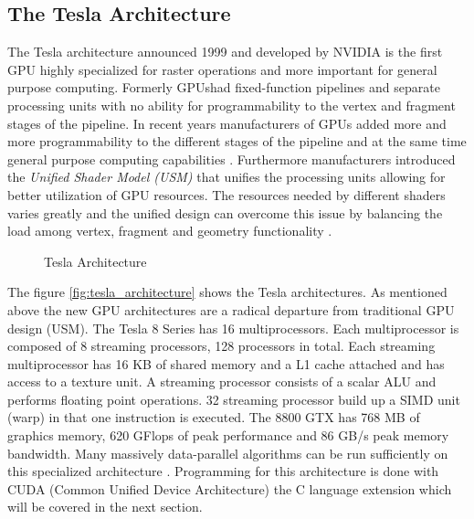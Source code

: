 \subsection*{The Tesla Architecture} %
\label{sub:the_tesla_architecture}
The Tesla architecture announced 1999 and developed by NVIDIA is the first
GPU highly specialized for raster operations and more important
for general purpose computing. Formerly \glspl{GPU}had fixed-function
pipelines and separate processing units with no ability for programmability to
the vertex and fragment stages of the pipeline. In recent years manufacturers of
GPUs added more and more programmability to the different stages
of the pipeline and at the same time general purpose computing capabilities
\citep{citeulike:3844545}. Furthermore manufacturers introduced the \emph{Unified
Shader Model (USM)} that unifies the processing units allowing for better
utilization of \gls{GPU} resources. The resources needed by different
shaders varies greatly and the unified design can overcome this issue by
balancing the load among vertex, fragment and geometry functionality
\citep{citeulike:3145468}.

\begin{figure}[ht]
\centering
\caption{Tesla Architecture}
\label{fig:tesla_architecture}
\end{figure}

The figure \autoref{fig:tesla_architecture} shows the Tesla architectures. As
mentioned above the new \gls{GPU} architectures are a radical departure
from traditional \gls{GPU} design (USM). The Tesla 8 Series has 16 multiprocessors. 
Each multiprocessor is composed of 8 streaming processors, 128 processors in 
total. Each streaming multiprocessor has 16 KB of shared memory
and a L1 cache attached and has access to a texture unit. A streaming processor
consists of a scalar ALU and performs floating point operations. 32 streaming
processor build up a SIMD unit (warp) in that one instruction is executed.
The 8800 GTX has 768 MB of graphics memory, 620 GFlops of peak performance and
86 GB/s peak memory bandwidth. Many massively data-parallel algorithms can be
run sufficiently on this specialized architecture \citep{citeulike:3145468}.
Programming for this architecture is done with \gls{CUDA} (Common Unified Device
Architecture) the C language extension which will be covered in the next
section.


